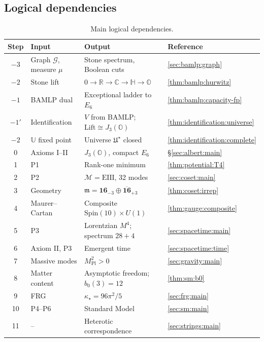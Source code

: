 \subsection{Logical dependencies}
\label{sec:master:map}

\begin{table}[t]
  \centering
  \small
  \renewcommand{\arraystretch}{1.22}
  \begin{tabular}{@{}clll@{}}
    \toprule
    Step & Input & Output & Reference \\
    \midrule
    $-3$ & Graph $\mathcal{G}$, measure $\mu$ & Stone spectrum, Boolean cuts &
      \autoref{sec:bamlp:graph} \\
    $-2$ & Stone lift & $0\to\mathbb{R}\to\mathbb{C}\to\mathbb{H}\to\mathbb{O}$ &
      \autoref{thm:bamlp:hurwitz} \\
    $-1$ & BAMLP dual & Exceptional ladder to $E_6$ &
      \autoref{thm:bamlp:capacity-fp} \\
    $-1'$ & Identification & $V$ from BAMLP; $\mathrm{Lift}\cong J_3(\mathbb O)$ &
      \autoref{thm:identification:universe} \\
    $-2$ & $\mathbb{U}$ fixed point & Universe $\mathfrak{U}^\star$ closed &
      \autoref{thm:identification:complete} \\
    0 & Axioms I--II & $J_3(\mathbb O)$, compact $E_6$ & \S\ref{sec:albert:main} \\
    1 & P1 & Rank-one minimum & \autoref{thm:potential:T4} \\
    2 & P2 & $\mathcal M=\mathrm{EIII}$, 32 modes & \autoref{sec:coset:main} \\
    3 & Geometry & $\mathfrak m=\mathbf{16}_{-3}\oplus\overline{\mathbf{16}}_{+3}$ & \autoref{thm:coset:irrep} \\
    4 & Maurer--Cartan & Composite $\mathrm{Spin}(10)\times U(1)$ & \autoref{thm:gauge:composite} \\
    5 & P3 & Lorentzian $M^4$; spectrum $28+4$ & \autoref{sec:spacetime:main} \\
    6 & Axiom II, P3 & Emergent time & \autoref{sec:spacetime:time} \\
    7 & Massive modes & $M_{\mathrm{Pl}}^2>0$ & \autoref{sec:gravity:main} \\
    8 & Matter content & Asymptotic freedom; $b_0(3)=12$ & \autoref{thm:sm:b0} \\
    9 & FRG & $\kappa_\star=96\pi^2/5$ & \autoref{sec:frg:main} \\
    10 & P4--P6 & Standard Model & \autoref{sec:sm:main} \\
    11 & -- & Heterotic correspondence & \autoref{sec:strings:main} \\
    \bottomrule
  \end{tabular}
  \caption{Main logical dependencies.}
  \label{tab:master:chain}
\end{table}

